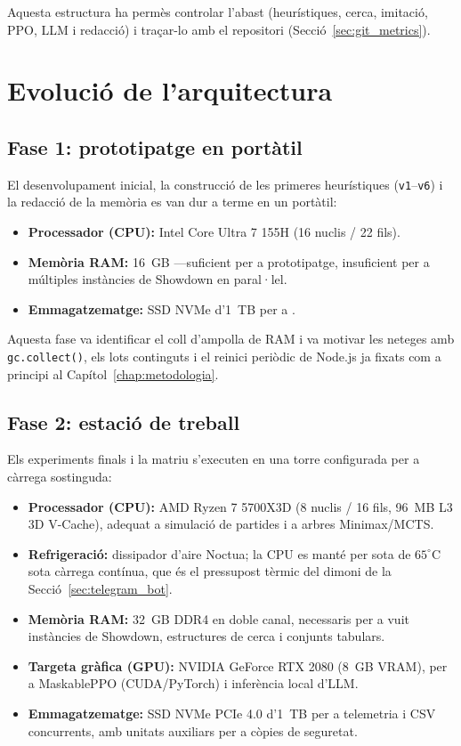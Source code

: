 Aquesta estructura ha permès controlar l'abast (heurístiques, cerca, imitació, PPO, LLM i redacció) i traçar-lo amb el repositori (Secció~\ref{sec:git_metrics}).

\section{Evolució de l'arquitectura}

\subsection{Fase 1: prototipatge en portàtil}

El desenvolupament inicial, la construcció de les primeres heurístiques (\texttt{v1}--\texttt{v6}) i la redacció de la memòria es van dur a terme en un portàtil:

\begin{itemize}
    \item \textbf{Processador (CPU):} Intel Core Ultra 7 155H (16 nuclis / 22 fils).
    \item \textbf{Memòria RAM:} 16~GB ---suficient per a prototipatge, insuficient per a múltiples instàncies de Showdown en paral·lel.
    \item \textbf{Emmagatzematge:} SSD NVMe d'1~TB per a .
\end{itemize}

Aquesta fase va identificar el coll d'ampolla de RAM i va motivar les neteges amb \texttt{gc.collect()}, els lots continguts i el reinici periòdic de Node.js ja fixats com a principi al Capítol~\ref{chap:metodologia}.

\subsection{Fase 2: estació de treball}

Els experiments finals i la matriu s'executen en una torre configurada per a càrrega sostinguda:

\begin{itemize}
    \item \textbf{Processador (CPU):} AMD Ryzen 7 5700X3D (8 nuclis / 16 fils, 96~MB L3 3D V-Cache), adequat a simulació de partides i a arbres Minimax/MCTS.
    \item \textbf{Refrigeració:} dissipador d'aire Noctua; la CPU es manté per sota de $65^\circ$C sota càrrega contínua, que és el pressupost tèrmic del dimoni de la Secció~\ref{sec:telegram_bot}.
    \item \textbf{Memòria RAM:} 32~GB DDR4 en doble canal, necessaris per a vuit instàncies de Showdown, estructures de cerca i conjunts tabulars.
    \item \textbf{Targeta gràfica (GPU):} NVIDIA GeForce RTX 2080 (8~GB VRAM), per a MaskablePPO (CUDA/PyTorch) i inferència local d'LLM.
    \item \textbf{Emmagatzematge:} SSD NVMe PCIe 4.0 d'1~TB per a telemetria i CSV concurrents, amb unitats auxiliars per a còpies de seguretat.
\end{itemize}


